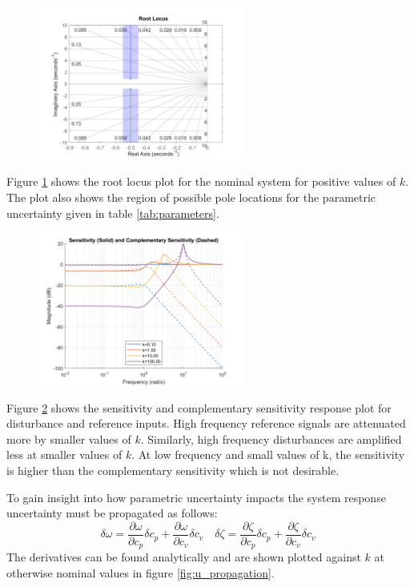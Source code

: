 \documentclass{article}
\begin{document}
\begin{figure}[H]
    \centering
    \includegraphics[width=0.6\textwidth]{figures/rlocus_G.png}
    \caption{}
    \label{fig:rlocus_G}
\end{figure}

Figure \ref{fig:rlocus_G} shows the root locus plot for the nominal system for positive values of $k$.
The plot also shows the region of possible pole locations for the parametric uncertainty given in table \ref{tab:parameters}.

\begin{figure}[H]
    \centering
    \includegraphics[width=0.6\textwidth]{figures/sensitivities.png}
    \caption{}
    \label{fig:sensitivities}
\end{figure}

Figure \ref{fig:sensitivities} shows the sensitivity and complementary sensitivity response plot for disturbance and reference inputs.
High frequency reference signals are attenuated more by smaller values of $k$. Similarly, high frequency disturbances are amplified less at smaller values of $k$.
At low frequency and small values of k, the sensitivity is higher than the complementary sensitivity which is not desirable.

To gain insight into how parametric uncertainty impacts the system response uncertainty must be propagated as follows:
\begin{equation}
    \delta \omega = \frac{\partial \omega}{\partial c_p} \delta c_p + \frac{\partial \omega}{\partial c_v} \delta c_v \quad \delta \zeta = \frac{\partial \zeta}{\partial c_p} \delta c_p + \frac{\partial \zeta}{\partial c_v} \delta c_v
\end{equation}
The derivatives can be found analytically and are shown plotted against $k$ at otherwise nominal values in figure \ref{fig:u_propagation}.
\end{document}
